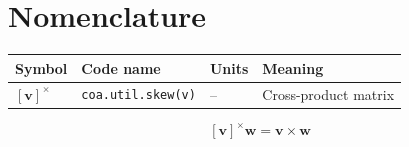 \section*{Nomenclature}
\begin{tabular}{llll}
\toprule
Symbol & Code name & Units & Meaning \\
\midrule
$[\mathbf{v}]^\times$ & \texttt{coa.util.skew(v)} & -- & Cross-product matrix \\
\bottomrule
\end{tabular}

\begin{equation}\label{eq:skew}
  [\mathbf{v}]^\times \mathbf{w} = \mathbf{v} \times \mathbf{w}
\end{equation}
